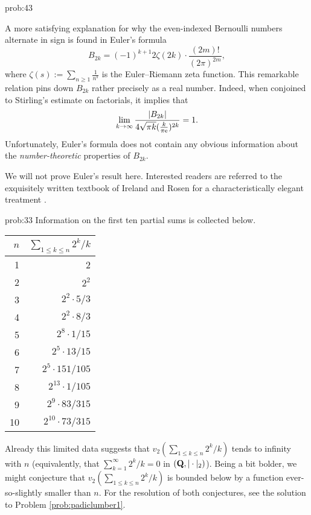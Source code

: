 \begin{sol}{prob:43}
\begin{rmk} A more satisfying explanation for why the even-indexed Bernoulli numbers alternate in sign is found in Euler's formula
    \[ B_{2k} = (-1)^{k+1} 2\zeta(2k) \cdot \frac{(2m)!}{(2\pi)^{2m}}, \]
    where $\zeta(s):=\sum_{n\ge 1} \frac{1}{n^s}$ is the \textsf{Euler--Riemann zeta function}. This remarkable relation pins down $B_{2k}$ rather precisely as a real number. Indeed, when conjoined to Stirling's estimate on factorials, it implies that
    \[ \lim_{k\to\infty} \frac{|B_{2k}|}{4\sqrt{\pi k} (\frac{k}{\pi \mathrm{e}})^{2k}} = 1.\]
Unfortunately, Euler's formula does not contain any obvious information about the \emph{number-theoretic} properties of $B_{2k}$.
    
    We will not prove Euler's result here. Interested readers are referred to the exquisitely written textbook of Ireland and Rosen for a characteristically elegant treatment \cite[pp.\ 231--232]{IR}.
\end{rmk}
\end{sol}



\begin{sol}{prob:33} Information on the first ten        partial sums is collected below.

{
\centering
\setlength{\tabcolsep}{16pt}
    \begin{tabular}{rr}
        $n$ & $\sum_{1\le k\le n}2^k/k$ \\\midrule
        1 & 2 \\
        2 & $2^2$  \\
        3 & $2^2 \cdot 5/3$ \\
        4 & $2^2 \cdot 8/3$\\
        5 & $2^8 \cdot 1/15$  \\
        6 & $2^5\cdot 13/15$ \\
        7 & $2^5 \cdot 151/105$ \\
        8 & $2^{13} \cdot 1/105$ \\
        9 & $2^9 \cdot 83/315$ \\
        10 & $2^{10} \cdot 73/315$
    \end{tabular}\par
}

    
Already this limited data suggests that $v_2(\sum_{1\le k\le n} 2^k/k)$ tends to infinity with $n$ (equivalently, that $\sum_{k=1}^{\infty}2^k/k = 0$ in $(\mathbf{Q},|\cdot|_2)$). Being a bit bolder, we might conjecture that $v_2(\sum_{1\le k\le n} 2^k/k)$ is bounded below by a function ever-so-slightly smaller than $n$. For the resolution of both conjectures, see the solution to Problem \ref{prob:padiclumber1}.
\end{sol}


